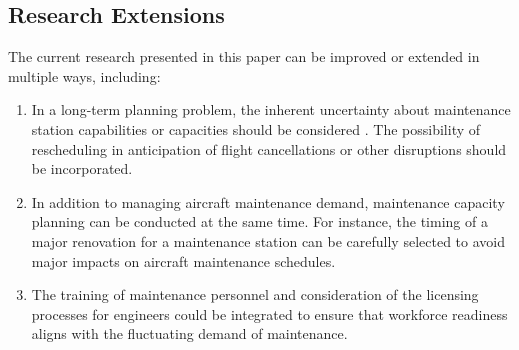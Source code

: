\subsection{Research Extensions}
The current research presented in this paper can be improved or extended in multiple ways, including:
\begin{enumerate}
    \item In a long-term planning problem, the inherent uncertainty about maintenance station capabilities or capacities should be considered \citep{sun2015stochastic}. The possibility of rescheduling in anticipation of flight cancellations or other disruptions should be incorporated. 
    \item In addition to managing aircraft maintenance demand, maintenance capacity planning can be conducted at the same time. For instance, the timing of a major renovation for a maintenance station can be carefully selected to avoid major impacts on aircraft maintenance schedules. 
    \item The training of maintenance personnel and consideration of the licensing processes for engineers could be integrated to ensure that workforce readiness aligns with the fluctuating demand of maintenance.
\end{enumerate}


